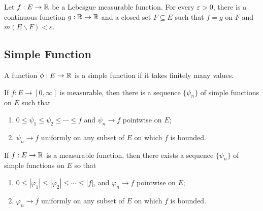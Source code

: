 \documentclass[class=book, crop=false]{standalone}
\begin{document}
        \begin{theorem}
            Let $f : E \rightarrow \mathbb{R}$ be a Lebesgue measurable function. For every $\varepsilon > 0$, there is a continuous function $g : \mathbb{R} \rightarrow \mathbb{R}$ and a closed set $F \subseteq E$ such that $f = g$ on $F$ and $m(E \backslash F) < \varepsilon$.
        \end{theorem}

        \subsection{Simple Function}
        \begin{definition}
            A function $\phi : E \rightarrow \mathbb{R}$ is a simple function if it takes finitely many values.
        \end{definition}

        \begin{theorem}
            If $f : E \rightarrow [0, \infty]$ is measurable, then there is a sequence $\{\psi_n\}$ of simple functions on $E$ such that
            \begin{enumerate}
                \item $0 \leq \psi_1 \leq \psi_2 \leq \cdots \leq f$ and $\psi_n \rightarrow f$ pointwise on $E$;
                \item $\psi_n \rightarrow f$ uniformly on any subset of $E$ on which $f$ is bounded.
            \end{enumerate}
        \end{theorem}

        \begin{theorem}
            If $f : E \rightarrow \mathbb{R}$ is a measurable function, then there exists a sequence $\{\psi_n\}$ of simple functions on $E$ so that
            \begin{enumerate}
                \item $0 \leq |\varphi_1| \leq |\varphi_2| \leq \cdots \leq |f|$, and $\varphi_n \rightarrow f$ pointwise on $E$;
                \item $\varphi_n \rightarrow f$ uniformly on any subset of $E$ on which $f$ is bounded.
            \end{enumerate}
        \end{theorem}
\end{document}
